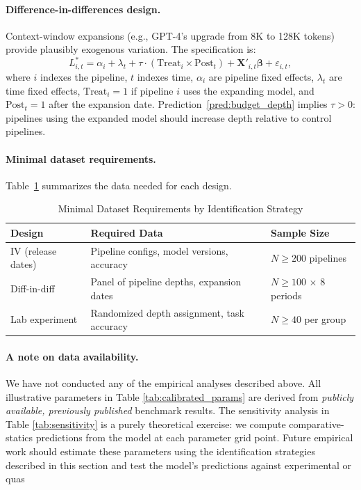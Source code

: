 \paragraph{Difference-in-differences design.} Context-window expansions (e.g., GPT-4's upgrade from 8K to 128K tokens) provide plausibly exogenous variation. The specification is:
\begin{equation}\label{eq:did}
L^*_{i,t} = \alpha_i + \lambda_t + \tau \cdot (\text{Treat}_i \times \text{Post}_t) + \mathbf{X}'_{i,t}\boldsymbol{\beta} + \varepsilon_{i,t},
\end{equation}
where $i$ indexes the pipeline, $t$ indexes time, $\alpha_i$ are pipeline fixed effects, $\lambda_t$ are time fixed effects, $\text{Treat}_i = 1$ if pipeline $i$ uses the expanding model, and $\text{Post}_t = 1$ after the expansion date. Prediction~\ref{pred:budget_depth} implies $\tau > 0$: pipelines using the expanded model should increase depth relative to control pipelines.

\paragraph{Minimal dataset requirements.} Table~\ref{tab:minimal_dataset} summarizes the data needed for each design.

\begin{table}[htbp]
\centering
\small
\caption{Minimal Dataset Requirements by Identification Strategy}
\label{tab:minimal_dataset}
\begin{tabular}{@{}>{\raggedright\arraybackslash}p{3.5cm}>{\raggedright\arraybackslash}p{4cm}>{\raggedright\arraybackslash}p{4cm}@{}}
\toprule
\textbf{Design} & \textbf{Required Data} & \textbf{Sample Size} \\
\midrule
IV (release dates) & Pipeline configs, model versions, accuracy & $N \geq 200$ pipelines \\
Diff-in-diff & Panel of pipeline depths, expansion dates & $N \geq 100$ $\times$ 8 periods \\
Lab experiment & Randomized depth assignment, task accuracy & $N \geq 40$ per group \\
\bottomrule
\end{tabular}
\end{table}

\paragraph{A note on data availability.} We have not conducted any of the empirical analyses described above. All illustrative parameters in Table \ref{tab:calibrated_params} are derived from \emph{publicly available, previously published} benchmark results. The sensitivity analysis in Table \ref{tab:sensitivity} is a purely theoretical exercise: we compute comparative-statics predictions from the model at each parameter grid point. Future empirical work should estimate these parameters using the identification strategies described in this section and test the model's predictions against experimental or quas